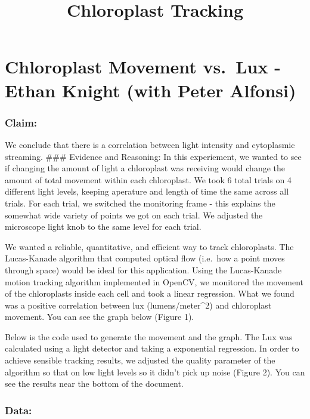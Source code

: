 \documentclass[11pt]{article}
\title{Chloroplast Tracking}
\begin{document}
    
    
    \maketitle
    
    

    
    \section{Chloroplast Movement vs.~Lux - Ethan Knight (with Peter
Alfonsi)}\label{chloroplast-movement-vs.lux---ethan-knight-with-peter-alfonsi}

\subsubsection{Claim:}\label{claim}

We conclude that there is a correlation between light intensity and
cytoplasmic streaming. \#\#\# Evidence and Reasoning: In this
experiement, we wanted to see if changing the amount of light a
chloroplast was receiving would change the amount of total movement
within each chloroplast. We took 6 total trials on 4 different light
levels, keeping aperature and length of time the same across all trials.
For each trial, we switched the monitoring frame - this explains the
somewhat wide variety of points we got on each trial. We adjusted the
microscope light knob to the same level for each trial.

We wanted a reliable, quantitative, and efficient way to track
chloroplasts. The Lucas-Kanade algorithm that computed optical flow
(i.e.~how a point moves through space) would be ideal for this
application. Using the Lucas-Kanade motion tracking algorithm
implemented in OpenCV, we monitored the movement of the chloroplasts
inside each cell and took a linear regression. What we found was a
positive correlation between lux (lumens/meter\^{}2) and chloroplast
movement. You can see the graph below (Figure 1).

Below is the code used to generate the movement and the graph. The Lux
was calculated using a light detector and taking a exponential
regression. In order to achieve sensible tracking results, we adjusted
the quality parameter of the algorithm so that on low light levels so it
didn't pick up noise (Figure 2). You can see the results near the bottom
of the document.

    \subsubsection{Data:}\label{data}
\end{document}
